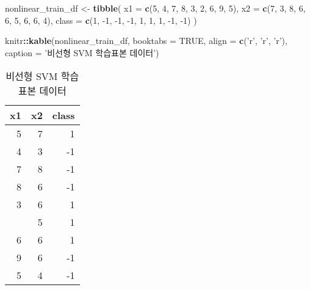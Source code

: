 \documentclass[]{book}
\newenvironment{Shaded}{\begin{snugshade}}{\end{snugshade}}
\newcommand{\DataTypeTok}[1]{\textcolor[rgb]{0.13,0.29,0.53}{#1}}
\newcommand{\DecValTok}[1]{\textcolor[rgb]{0.00,0.00,0.81}{#1}}
\newcommand{\KeywordTok}[1]{\textcolor[rgb]{0.13,0.29,0.53}{\textbf{#1}}}
\newcommand{\NormalTok}[1]{#1}
\newcommand{\OperatorTok}[1]{\textcolor[rgb]{0.81,0.36,0.00}{\textbf{#1}}}
\newcommand{\OtherTok}[1]{\textcolor[rgb]{0.56,0.35,0.01}{#1}}
\newcommand{\StringTok}[1]{\textcolor[rgb]{0.31,0.60,0.02}{#1}}
\begin{document}
\begin{Shaded}
\begin{Highlighting}[]
\NormalTok{nonlinear_train_df <-}\StringTok{ }\KeywordTok{tibble}\NormalTok{(}
  \DataTypeTok{x1 =} \KeywordTok{c}\NormalTok{(}\DecValTok{5}\NormalTok{, }\DecValTok{4}\NormalTok{, }\DecValTok{7}\NormalTok{, }\DecValTok{8}\NormalTok{, }\DecValTok{3}\NormalTok{, }\DecValTok{2}\NormalTok{, }\DecValTok{6}\NormalTok{, }\DecValTok{9}\NormalTok{, }\DecValTok{5}\NormalTok{), }
  \DataTypeTok{x2 =} \KeywordTok{c}\NormalTok{(}\DecValTok{7}\NormalTok{, }\DecValTok{3}\NormalTok{, }\DecValTok{8}\NormalTok{, }\DecValTok{6}\NormalTok{, }\DecValTok{6}\NormalTok{, }\DecValTok{5}\NormalTok{, }\DecValTok{6}\NormalTok{, }\DecValTok{6}\NormalTok{, }\DecValTok{4}\NormalTok{), }
  \DataTypeTok{class =} \KeywordTok{c}\NormalTok{(}\DecValTok{1}\NormalTok{, }\DecValTok{-1}\NormalTok{, }\DecValTok{-1}\NormalTok{, }\DecValTok{-1}\NormalTok{, }\DecValTok{1}\NormalTok{, }\DecValTok{1}\NormalTok{, }\DecValTok{1}\NormalTok{, }\DecValTok{-1}\NormalTok{, }\DecValTok{-1}\NormalTok{)}
\NormalTok{)}

\NormalTok{knitr}\OperatorTok{::}\KeywordTok{kable}\NormalTok{(nonlinear_train_df, }\DataTypeTok{booktabs =} \OtherTok{TRUE}\NormalTok{,}
             \DataTypeTok{align =} \KeywordTok{c}\NormalTok{(}\StringTok{'r'}\NormalTok{, }\StringTok{'r'}\NormalTok{, }\StringTok{'r'}\NormalTok{),}
             \DataTypeTok{caption =} \StringTok{'비선형 SVM 학습표본 데이터'}\NormalTok{)}
\end{Highlighting}
\end{Shaded}

\begin{table}[t]

\caption{\label{tab:nonlinear-svm-train-data}비선형 SVM 학습표본 데이터}
\centering
\begin{tabular}{rrr}
\toprule
x1 & x2 & class\\
\midrule
5 & 7 & 1\\
4 & 3 & -1\\
7 & 8 & -1\\
8 & 6 & -1\\
3 & 6 & 1\\
\addlinespace
2 & 5 & 1\\
6 & 6 & 1\\
9 & 6 & -1\\
5 & 4 & -1\\
\bottomrule
\end{tabular}
\end{table}
\end{document}
